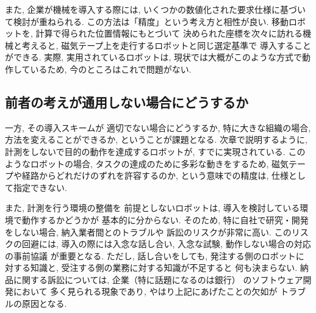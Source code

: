 \documentclass[twocolumn]{jarticle} %
\begin{document}
また, 企業が機械を導入する際には, 
いくつかの数値化された要求仕様に基づいて検討が重ねられる. 
この方法は「精度」という考え方と相性が良い. 
移動ロボットを, 計算で得られた位置情報にもとづいて
決められた座標を次々に訪れる機械と考えると, 
磁気テープ上を走行するロボットと同じ選定基準で
導入することができる. 
実際, 実用されているロボットは, 
現状では大概がこのような方式で動作しているため, 
今のところはこれで問題がない. 



%
%
%
%

\subsection{前者の考えが通用しない場合にどうするか}\label{sub:business}

一方, その導入スキームが
適切でない場合にどうするか, 
特に大きな組織の場合, 
方法を変えることができるか, 
ということが課題となる. 
次章で説明するように, 
計測をしないで目的の動作を達成するロボットが, 
すでに実現されている. 
このようなロボットの場合, 
タスクの達成のために多彩な動きをするため, 
磁気テープや経路からどれだけのずれを許容するのか, 
という意味での精度は, 仕様として指定できない. 

また, 計測を行う環境の整備を
前提としないロボットは, 
導入を検討している環境で動作するかどうかが
基本的に分からない. 
そのため, 特に自社で研究・開発をしない場合, 
納入業者間とのトラブルや
訴訟のリスクが非常に高い. 
このリスクの回避には, 導入の際には入念な話し合い, 
入念な試験, 動作しない場合の対応の事前協議
が重要となる. ただし, 話し合いをしても, 
発注する側のロボットに対する知識と, 
受注する側の業務に対する知識が不足すると
何も決まらない. 
納品に関する訴訟については, 
企業（特に話題になるのは銀行）
のソフトウェア開発において
多く見られる現象であり, 
やはり上記にあげたことの欠如が
トラブルの原因となる. 
\end{document}

